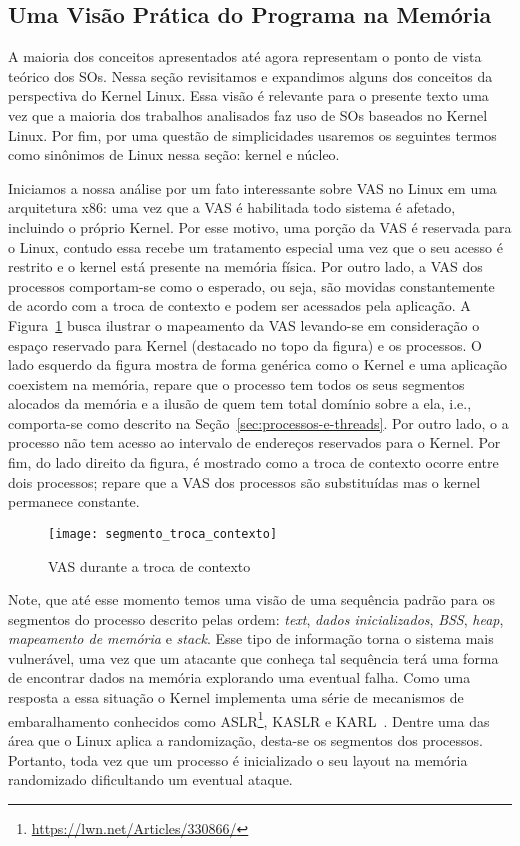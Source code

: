 \subsection{Uma Visão Prática do Programa na Memória}
\label{sec:visao_pratica_mem}

A maioria dos conceitos apresentados até agora representam o ponto de vista
teórico dos SOs. Nessa seção revisitamos e expandimos alguns dos conceitos da
perspectiva do Kernel Linux. Essa visão é relevante para o presente texto uma
vez que a maioria dos trabalhos analisados faz uso de SOs baseados no Kernel
Linux. Por fim, por uma questão de simplicidades usaremos os seguintes termos
como sinônimos de Linux nessa seção: kernel e núcleo.

Iniciamos a nossa análise por um fato interessante sobre VAS no Linux em uma
arquitetura x86: uma vez que a VAS é habilitada todo sistema é afetado,
incluindo o próprio Kernel. Por esse motivo, uma porção da VAS é reservada para
o Linux, contudo essa recebe um tratamento especial uma vez que o seu acesso é
restrito e o kernel está presente na memória física. Por outro lado, a VAS dos
processos comportam-se como o esperado, ou seja, são movidas constantemente de
acordo com a troca de contexto e podem ser acessados pela aplicação. A
Figura~\ref{fig:vas_contexto} busca ilustrar o mapeamento da VAS levando-se em
consideração o espaço reservado para Kernel (destacado no topo da figura) e os
processos. O lado esquerdo da figura mostra de forma genérica como o Kernel e
uma aplicação coexistem na memória, repare que o processo tem todos os seus
segmentos alocados da memória e a ilusão de quem tem total domínio sobre a ela,
i.e., comporta-se como descrito na Seção~\ref{sec:processos-e-threads}. Por
outro lado, o a processo não tem acesso ao intervalo de endereços reservados
para o Kernel. Por fim, do lado direito da figura, é mostrado como a troca de
contexto ocorre entre dois processos; repare que a VAS dos processos são
substituídas mas o kernel permanece constante.

\begin{figure}[!h]
  \centering
  \texttt{[image: segmento\_troca\_contexto]}
  \caption{VAS durante a troca de contexto~\citep{kernel_manage_mem}}
  \label{fig:vas_contexto}
\end{figure}

Note, que até esse momento temos uma visão de uma sequência padrão para os
segmentos do processo descrito pelas ordem: \emph{text}, \emph{dados
inicializados}, \emph{BSS}, \emph{heap}, \emph{mapeamento de memória} e
\emph{stack}. Esse tipo de informação torna o sistema mais vulnerável, uma vez
que um atacante que conheça tal sequência terá uma forma de encontrar dados na
memória explorando uma eventual falha. Como uma resposta a essa situação
o Kernel implementa uma série de mecanismos de embaralhamento
conhecidos como ASLR\footnote{\url{https://lwn.net/Articles/330866/}}, KASLR e
KARL~\citep{kaslr}. Dentre uma das área que o Linux aplica a randomização,
desta-se os segmentos dos processos. Portanto, toda vez que um processo é
inicializado o seu layout na memória randomizado dificultando um eventual
ataque.

